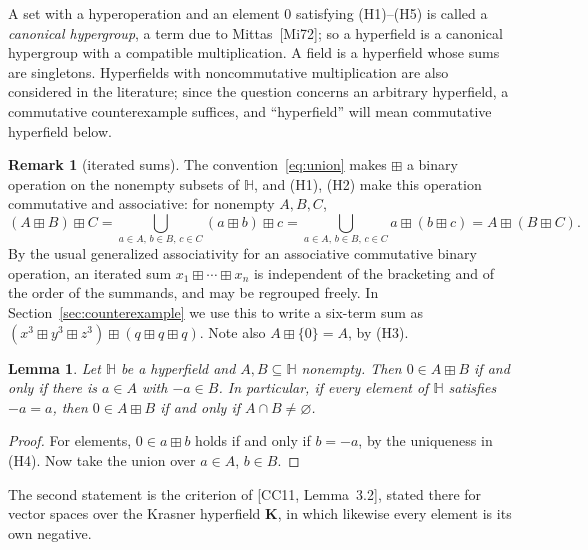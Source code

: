 \documentclass[11pt]{article}
\theoremstyle{plain}
\newtheorem{lemma}[theorem]{Lemma}
\theoremstyle{definition}
\newtheorem{remark}[theorem]{Remark}
\newcommand{\Hh}{\mathbb{H}}
\newcommand{\bp}{\boxplus}
\begin{document}
A set with a hyperoperation and an element $0$ satisfying (H1)--(H5) is
called a \emph{canonical hypergroup}, a term due to Mittas~[Mi72]; so a
hyperfield is a canonical hypergroup with a compatible multiplication.
A field is a hyperfield whose sums are singletons.  Hyperfields with noncommutative
multiplication are also considered in the literature; since the
question concerns an arbitrary hyperfield, a commutative counterexample
suffices, and ``hyperfield'' will mean commutative hyperfield below.

\begin{remark}[iterated sums]\label{rem:iterated}
The convention~\eqref{eq:union} makes $\bp$ a binary operation on the
nonempty subsets of $\Hh$, and (H1), (H2) make this operation
commutative and associative: for nonempty $A,B,C$,
\[
 (A\bp B)\bp C
 =\bigcup_{a\in A,\,b\in B,\,c\in C}(a\bp b)\bp c
 =\bigcup_{a\in A,\,b\in B,\,c\in C}a\bp(b\bp c)
 =A\bp(B\bp C).
\]
By the usual generalized associativity for an associative commutative
binary operation, an iterated sum $x_1\bp\cdots\bp x_n$ is independent
of the bracketing and of the order of the summands, and may be regrouped
freely.  In Section~\ref{sec:counterexample} we use this to write a
six-term sum as $(x^3\bp y^3\bp z^3)\bp(q\bp q\bp q)$.  Note also
$A\bp\{0\}=A$, by (H3).
\end{remark}

\begin{lemma}\label{lem:zero}
Let $\Hh$ be a hyperfield and $A,B\subseteq\Hh$ nonempty.  Then
$0\in A\bp B$ if and only if there is $a\in A$ with $-a\in B$.
In particular, if every element of $\Hh$ satisfies $-a=a$, then
$0\in A\bp B$ if and only if $A\cap B\neq\varnothing$.
\end{lemma}
\begin{proof}
For elements, $0\in a\bp b$ holds if and only if $b=-a$, by the
uniqueness in (H4).  Now take the union over $a\in A$, $b\in B$.
\end{proof}

The second statement is the criterion of [CC11, Lemma~3.2], stated
there for vector spaces over the Krasner hyperfield $\mathbf K$, in
which likewise every element is its own negative.
\end{document}
